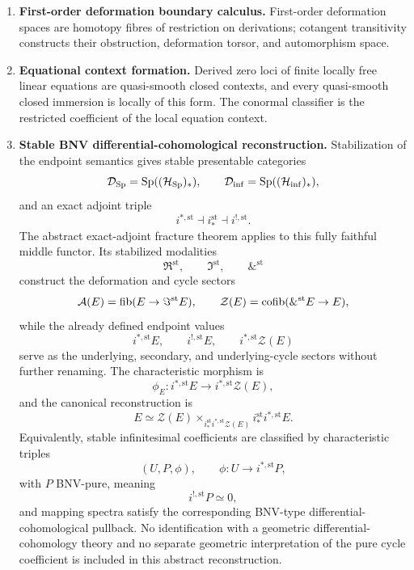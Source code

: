 \begin{theorem}
\begin{enumerate}[label=(\roman*)]
    \item \textbf{First-order deformation boundary calculus.}
    First-order deformation spaces are homotopy fibres of restriction on
    derivations; cotangent transitivity constructs their obstruction,
    deformation torsor, and automorphism space.

    \item \textbf{Equational context formation.}
    Derived zero loci of finite locally free linear equations are quasi-smooth
    closed contexts, and every quasi-smooth closed immersion is locally of this
    form. The conormal classifier is the restricted coefficient of the local
    equation context.

    \item \textbf{Stable BNV differential-cohomological reconstruction.}
    Stabilization of the endpoint semantics gives stable presentable
    categories
    \[
        \mathcal D_{\operatorname{Sp}}
        =
        \operatorname{Sp}((\mathcal H_{\operatorname{Sp}})_*),
        \qquad
        \mathcal D_{\inf}
        =
        \operatorname{Sp}((\mathcal H_{\inf})_*),
    \]
    and an exact adjoint triple
    \[
        i^{*,\mathrm{st}}
        \dashv
        i_*^{\mathrm{st}}
        \dashv
        i^{!,\mathrm{st}}.
    \]
    The abstract exact-adjoint fracture theorem
     applies to this fully faithful middle
    functor. Its stabilized modalities
    \[
        \Re^{\mathrm{st}},
        \qquad
        \Im^{\mathrm{st}},
        \qquad
        \&^{\mathrm{st}}
    \]
    construct the deformation and cycle sectors
    \[
        \mathcal A(E)
        =
        \operatorname{fib}(E\to\Im^{\mathrm{st}}E),
        \qquad
        \mathcal Z(E)
        =
        \operatorname{cofib}(\&^{\mathrm{st}}E\to E),
    \]
    while the already defined endpoint values
    \[
        i^{*,\mathrm{st}}E,
        \qquad
        i^{!,\mathrm{st}}E,
        \qquad
        i^{*,\mathrm{st}}\mathcal Z(E)
    \]
    serve as the underlying, secondary, and underlying-cycle sectors without
    further renaming. The characteristic morphism is
    \[
        \phi_E:
        i^{*,\mathrm{st}}E
        \longrightarrow
        i^{*,\mathrm{st}}\mathcal Z(E),
    \]
    and the canonical reconstruction is
    \[
        E
        \simeq
        \mathcal Z(E)
        \times_{i_*^{\mathrm{st}}i^{*,\mathrm{st}}\mathcal Z(E)}
        i_*^{\mathrm{st}}i^{*,\mathrm{st}}E.
    \]
    Equivalently, stable infinitesimal coefficients are classified by
    characteristic triples
    \[
        (U,P,\phi),
        \qquad
        \phi:U\longrightarrow i^{*,\mathrm{st}}P,
    \]
    with \(P\) BNV-pure, meaning
    \[
        i^{!,\mathrm{st}}P\simeq0,
    \]
    and mapping spectra satisfy the corresponding BNV-type
    differential-cohomological pullback. No identification with a geometric
    differential-cohomology theory and no separate geometric interpretation of
    the pure cycle coefficient is included in this abstract reconstruction.


\end{enumerate}
\end{theorem}
